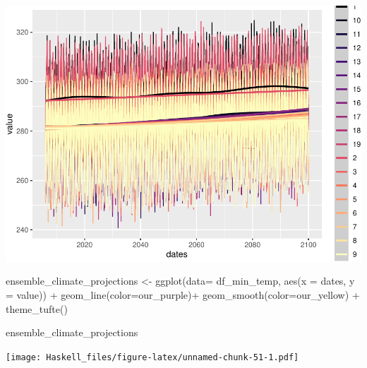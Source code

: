 \documentclass[
  paper=a4,
  ,captions=tableheading
]{scrartcl}
\newenvironment{Shaded}{\begin{snugshade}}{\end{snugshade}}
\newcommand{\AttributeTok}[1]{\textcolor[rgb]{0.77,0.63,0.00}{#1}}
\newcommand{\FunctionTok}[1]{\textcolor[rgb]{0.00,0.00,0.00}{#1}}
\newcommand{\NormalTok}[1]{#1}
\newcommand{\OtherTok}[1]{\textcolor[rgb]{0.56,0.35,0.01}{#1}}
\newcommand{\SpecialCharTok}[1]{\textcolor[rgb]{0.00,0.00,0.00}{#1}}
\begin{document}
\includegraphics{Haskell_files/figure-latex/unnamed-chunk-50-1.pdf}

\begin{Shaded}
\begin{Highlighting}[]
\NormalTok{ensemble\_climate\_projections }\OtherTok{\textless{}{-}} \FunctionTok{ggplot}\NormalTok{(}\AttributeTok{data=}\NormalTok{ df\_min\_temp, }\FunctionTok{aes}\NormalTok{(}\AttributeTok{x =}\NormalTok{ dates, }\AttributeTok{y =}\NormalTok{ value)) }\SpecialCharTok{+} 
  \FunctionTok{geom\_line}\NormalTok{(}\AttributeTok{color=}\NormalTok{our\_purple)}\SpecialCharTok{+}
  \FunctionTok{geom\_smooth}\NormalTok{(}\AttributeTok{color=}\NormalTok{our\_yellow) }\SpecialCharTok{+}
  \FunctionTok{theme\_tufte}\NormalTok{()}
  

\NormalTok{ensemble\_climate\_projections}
\end{Highlighting}
\end{Shaded}

\texttt{[image: Haskell\_files/figure-latex/unnamed-chunk-51-1.pdf]}
\end{document}
